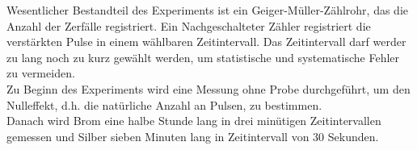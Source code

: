Wesentlicher Bestandteil des Experiments ist ein Geiger-Müller-Zählrohr, das die Anzahl der Zerfälle registriert. Ein Nachgeschalteter Zähler registriert die verstärkten Pulse in einem wählbaren Zeitintervall. Das Zeitintervall darf werder zu lang noch zu kurz gewählt werden, um statistische und systematische Fehler zu vermeiden. \\
Zu Beginn des Experiments wird eine Messung ohne Probe durchgeführt, um den Nulleffekt, d.h. die natürliche Anzahl an Pulsen, zu bestimmen. \\
Danach wird Brom eine halbe Stunde lang in drei minütigen Zeitintervallen gemessen und Silber sieben Minuten lang in Zeitintervall von 30 Sekunden.

